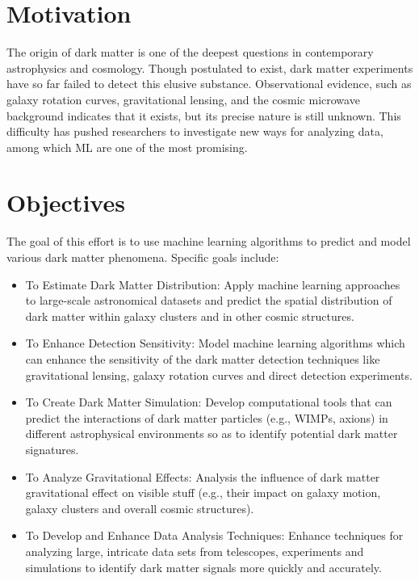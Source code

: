 \section{Motivation}
The origin of dark matter is one of the deepest questions in contemporary astrophysics and cosmology. Though postulated to exist, dark matter experiments have so far failed to detect this elusive substance. Observational evidence, such as galaxy rotation curves, gravitational lensing, and the cosmic microwave background indicates that it exists, but its precise nature is still unknown. This difficulty has pushed researchers to investigate new ways for analyzing data, among which ML are one of the most promising.

 



 
\section{Objectives} 
The goal of this effort is to use machine learning algorithms to predict and model various dark matter phenomena. Specific goals include:

\begin{itemize}
    \item To Estimate Dark Matter Distribution: Apply machine learning approaches to large-scale astronomical datasets and predict the spatial distribution of dark matter within galaxy clusters and in other cosmic structures.

    \item To Enhance Detection Sensitivity: Model machine learning algorithms which can enhance the sensitivity of the dark matter detection techniques like gravitational lensing, galaxy rotation curves and direct detection experiments.

    \item To Create Dark Matter Simulation: Develop computational tools that can predict the interactions of dark matter particles (e.g., WIMPs, axions) in different astrophysical environments so as to identify potential dark matter signatures.

    \item To Analyze Gravitational Effects: Analysis the influence of dark matter gravitational effect on visible stuff (e.g., their impact on galaxy motion, galaxy clusters and overall cosmic structures).

    \item To Develop and Enhance Data Analysis Techniques: Enhance techniques for analyzing large, intricate data sets from telescopes, experiments and simulations to identify dark matter signals more quickly and accurately.
\end{itemize}

